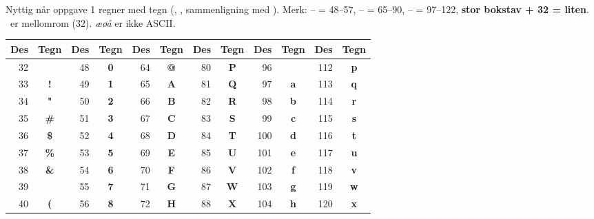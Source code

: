 
Nyttig når oppgave 1 regner med tegn (, , sammenligning med ).
Merk: -- = 48--57, -- = 65--90, -- = 97--122, \textbf{stor bokstav + 32 = liten}.
\textvisiblespace\ er mellomrom (32). \emph{æøå} er ikke ASCII.

\begin{center}
{\ttfamily\small\setlength{\tabcolsep}{4pt}\renewcommand{\arraystretch}{1.15}
\begin{tabular}{@{}*{6}{r>{\columncolor{frodeblue!6}}c@{\hspace{10pt}}}@{}}
\toprule
\textbf{Des} & \textbf{Tegn} & \textbf{Des} & \textbf{Tegn} & \textbf{Des} & \textbf{Tegn} & \textbf{Des} & \textbf{Tegn} & \textbf{Des} & \textbf{Tegn} & \textbf{Des} & \textbf{Tegn} \\
\midrule
32 & \textbf{\textvisiblespace} & 48 & \textbf{0} & 64 & \textbf{@} & 80 & \textbf{P} & 96 & \textbf{\textasciigrave{}} & 112 & \textbf{p} \\
33 & \textbf{!} & 49 & \textbf{1} & 65 & \textbf{A} & 81 & \textbf{Q} & 97 & \textbf{a} & 113 & \textbf{q} \\
34 & \textbf{"} & 50 & \textbf{2} & 66 & \textbf{B} & 82 & \textbf{R} & 98 & \textbf{b} & 114 & \textbf{r} \\
35 & \textbf{\#} & 51 & \textbf{3} & 67 & \textbf{C} & 83 & \textbf{S} & 99 & \textbf{c} & 115 & \textbf{s} \\
36 & \textbf{\$} & 52 & \textbf{4} & 68 & \textbf{D} & 84 & \textbf{T} & 100 & \textbf{d} & 116 & \textbf{t} \\
37 & \textbf{\%} & 53 & \textbf{5} & 69 & \textbf{E} & 85 & \textbf{U} & 101 & \textbf{e} & 117 & \textbf{u} \\
38 & \textbf{\&} & 54 & \textbf{6} & 70 & \textbf{F} & 86 & \textbf{V} & 102 & \textbf{f} & 118 & \textbf{v} \\
39 & \textbf{\textquotesingle{}} & 55 & \textbf{7} & 71 & \textbf{G} & 87 & \textbf{W} & 103 & \textbf{g} & 119 & \textbf{w} \\
40 & \textbf{(} & 56 & \textbf{8} & 72 & \textbf{H} & 88 & \textbf{X} & 104 & \textbf{h} & 120 & \textbf{x} \\

\end{tabular}}
\end{center}
